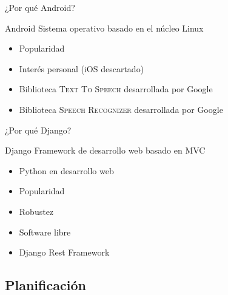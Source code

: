 \documentclass[10pt,xcolor=svgnames]{beamer}
\begin{document}
\begin{frame}{¿Por qué Android?}  
  \begin{block}{Android}
    Sistema operativo basado en el núcleo Linux
  \end{block}
  
  \begin{itemize}
  \item Popularidad
  \item Interés personal (iOS descartado)
  \item Biblioteca \textsc{Text To Speech} desarrollada por Google
  \item Biblioteca \textsc{Speech Recognizer} desarrollada por Google
  \end{itemize}
\end{frame}

\begin{frame}{¿Por qué Django?}  
  \begin{block}{Django}
    Framework de desarrollo web basado en MVC
  \end{block}
  
  \begin{itemize}
  \item Python en desarrollo web
  \item Popularidad
  \item Robustez
  \item Software libre
  \item Django Rest Framework
  \end{itemize}
\end{frame}


\subsection{Planificación}
\end{document}
